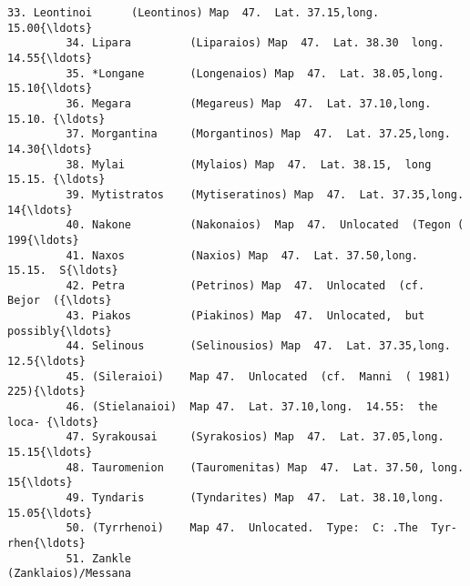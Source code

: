 \documentclass[11pt]{article}
\begin{document}
\begin{Verbatim}[commandchars=\\\{\}]
         33. Leontinoi      (Leontinos) Map  47.  Lat. 37.15,long.  15.00{\ldots}   
         34. Lipara         (Liparaios) Map  47.  Lat. 38.30  long. 14.55{\ldots}   
         35. *Longane       (Longenaios) Map  47.  Lat. 38.05,long. 15.10{\ldots}   
         36. Megara         (Megareus) Map  47.  Lat. 37.10,long.  15.10. {\ldots}   
         37. Morgantina     (Morgantinos) Map  47.  Lat. 37.25,long. 14.30{\ldots}   
         38. Mylai          (Mylaios) Map  47.  Lat. 38.15,  long  15.15. {\ldots}   
         39. Mytistratos    (Mytiseratinos) Map  47.  Lat. 37.35,long. 14{\ldots}   
         40. Nakone         (Nakonaios)  Map  47.  Unlocated  (Tegon ( 199{\ldots}   
         41. Naxos          (Naxios) Map  47.  Lat. 37.50,long.  15.15.  S{\ldots}   
         42. Petra          (Petrinos) Map  47.  Unlocated  (cf.  Bejor  ({\ldots}   
         43. Piakos         (Piakinos) Map  47.  Unlocated,  but  possibly{\ldots}   
         44. Selinous       (Selinousios) Map  47.  Lat. 37.35,long.  12.5{\ldots}   
         45. (Sileraioi)    Map 47.  Unlocated  (cf.  Manni  ( 1981)  225){\ldots}   
         46. (Stielanaioi)  Map 47.  Lat. 37.10,long.  14.55:  the  loca- {\ldots}   
         47. Syrakousai     (Syrakosios) Map  47.  Lat. 37.05,long. 15.15{\ldots}   
         48. Tauromenion    (Tauromenitas) Map  47.  Lat. 37.50, long. 15{\ldots}   
         49. Tyndaris       (Tyndarites) Map  47.  Lat. 38.10,long.  15.05{\ldots}   
         50. (Tyrrhenoi)    Map 47.  Unlocated.  Type:  C: .The  Tyr- rhen{\ldots}   
         51. Zankle                                      (Zanklaios)/Messana    
         

\end{Verbatim}
\end{document}
